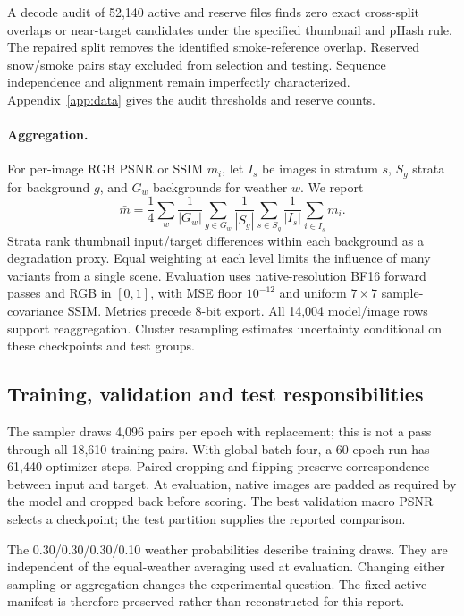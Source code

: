 A decode audit of 52,140 active and reserve files finds zero exact cross-split overlaps or near-target candidates under the specified thumbnail and pHash rule. The repaired split removes the identified smoke-reference overlap. Reserved snow/smoke pairs stay excluded from selection and testing. Sequence independence and alignment remain imperfectly characterized. Appendix~\ref{app:data} gives the audit thresholds and reserve counts.

\paragraph{Aggregation.}
For per-image RGB PSNR or SSIM $m_i$, let $I_s$ be images in stratum $s$, $S_g$ strata for background $g$, and $G_w$ backgrounds for weather $w$. We report
\begin{equation}
\bar m=\frac14\sum_w\frac1{|G_w|}\sum_{g\in G_w}
\frac1{|S_g|}\sum_{s\in S_g}\frac1{|I_s|}\sum_{i\in I_s}m_i.
\label{eq:metric}
\end{equation}
Strata rank thumbnail input/target differences within each background as a degradation proxy. Equal weighting at each level limits the influence of many variants from a single scene. Evaluation uses native-resolution BF16 forward passes and RGB in $[0,1]$, with MSE floor $10^{-12}$ and uniform $7\times7$ sample-covariance SSIM. Metrics precede 8-bit export. All 14,004 model/image rows support reaggregation. Cluster resampling estimates uncertainty conditional on these checkpoints and test groups.

\subsection{Training, validation and test responsibilities}
The sampler draws 4,096 pairs per epoch with replacement; this is not a pass
through all 18,610 training pairs. With global batch four, a 60-epoch run has
61,440 optimizer steps. Paired cropping and flipping preserve correspondence
between input and target. At evaluation, native images are padded as required
by the model and cropped back before scoring. The best validation macro PSNR
selects a checkpoint; the test partition supplies the reported comparison.

The 0.30/0.30/0.30/0.10 weather probabilities describe training draws.
They are independent of the equal-weather averaging used at evaluation.
Changing either sampling or aggregation changes the experimental question.
The fixed active manifest is therefore preserved rather than reconstructed
for this report.

